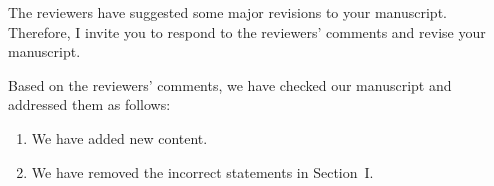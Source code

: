 \editor

\begin{generalcomment}
    The reviewers have suggested some major revisions to your manuscript. Therefore, I invite you to respond to the reviewers' comments and revise your manuscript.
\end{generalcomment}
\begin{revmeta}
    Based on the reviewers' comments, we have checked our manuscript and addressed them as follows:
    \begin{enumerate}
        \item We have added new content.
        \item We have removed the incorrect statements in Section~I.
    \end{enumerate}
\end{revmeta}
